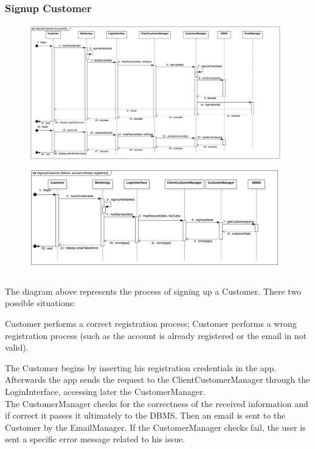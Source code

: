 \subsubsection{Signup Customer}
\begin{figure}[H]
    \begin{center}
        \includegraphics[width=\textwidth]{img/runtime/cust_signup_success}
        \includegraphics[width=\textwidth]{img/runtime/cust_signup_error}
    \end{center}
\end{figure}
The diagram above represents the process of signing up a Customer. There two possible situations:
\begin{itemize}
\itemize Customer performs a correct registration process;
\itemize Customer performs a wrong registration process (such as the account is already registered or the email in not valid).
\end{itemize}
The Customer begins by inserting his registration credentials in the app. Afterwards the app sends the request to the ClientCustomerManager through the LoginInterface, accessing later the CustomerManager.\\
The CustomerManager checks for the correctness of the received information and if correct it passes it ultimately to the DBMS. Then an email is sent to the Customer by the EmailManager. If the CustomerManager checks fail, the user is sent a specific error message related to his issue.
